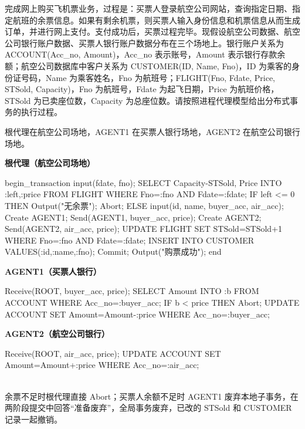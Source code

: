 \documentclass[10pt,a4paper]{article}
\newcommand{\zh}[1]{{\zhmono #1}}
\newenvironment{keep}{\par\noindent\begin{minipage}{\linewidth}\setlength{\parskip}{3pt plus 1pt}}{\end{minipage}\par\vspace{2pt}}
\begin{document}
\begin{keep}
\begin{prob}[2011 年第 5 题]
完成网上购买飞机票业务，过程是：买票人登录航空公司网站，查询指定日期、指定航班的余票信息。如果有剩余机票，则买票人输入身份信息和机票信息从而生成订单，并进行网上支付。支付成功后，买票过程完毕。现假设航空公司数据、航空公司银行账户数据、买票人银行账户数据分布在三个场地上。银行账户关系为 ACCOUNT(Acc\_no, Amount)，Acc\_no 表示账号，Amount 表示银行存款余额；航空公司数据库中客户关系为 CUSTOMER(ID, Name, Fno)，ID 为乘客的身份证号码，Name 为乘客姓名，Fno 为航班号；FLIGHT(Fno, Fdate, Price, STSold, Capacity)，Fno 为航班号，Fdate 为起飞日期，Price 为航班价格，STSold 为已卖座位数，Capacity 为总座位数。请按照进程代理模型给出分布式事务的执行过程。
\end{prob}
\begin{ans}[2011 年第 5 题]
根代理在航空公司场地，AGENT1 在买票人银行场地，AGENT2 在航空公司银行场地。\\[1pt]
\begin{minipage}[t]{0.58\linewidth}
\textbf{根代理（航空公司场地）}
\begin{code}
begin_transaction
 input(fdate, fno);
 SELECT Capacity-STSold, Price INTO :left,:price
   FROM FLIGHT WHERE Fno=:fno AND Fdate=:fdate;
 IF left <= 0 THEN
   Output("\zh{无余票}"); Abort;
 ELSE
   input(id, name, buyer_acc, air_acc);
   Create AGENT1; Send(AGENT1, buyer_acc, price);
   Create AGENT2; Send(AGENT2, air_acc, price);
   UPDATE FLIGHT SET STSold=STSold+1
     WHERE Fno=:fno AND Fdate=:fdate;
   INSERT INTO CUSTOMER VALUES(:id,:name,:fno);
   Commit;
   Output("\zh{购票成功}");
end
\end{code}
\end{minipage}\hfill
\begin{minipage}[t]{0.4\linewidth}
\textbf{AGENT1（买票人银行）}
\begin{code}
Receive(ROOT, buyer_acc, price);
SELECT Amount INTO :b FROM ACCOUNT
  WHERE Acc_no=:buyer_acc;
IF b < price THEN Abort;
UPDATE ACCOUNT
  SET Amount=Amount-:price
  WHERE Acc_no=:buyer_acc;
\end{code}
\textbf{AGENT2（航空公司银行）}
\begin{code}
Receive(ROOT, air_acc, price);
UPDATE ACCOUNT
  SET Amount=Amount+:price
  WHERE Acc_no=:air_acc;
\end{code}
\end{minipage}\\[2pt]
余票不足时根代理直接 Abort；买票人余额不足时 AGENT1 废弃本地子事务，在两阶段提交中回答“准备废弃”，全局事务废弃，已改的 STSold 和 CUSTOMER 记录一起撤销。
\end{ans}
\end{keep}
\end{document}
